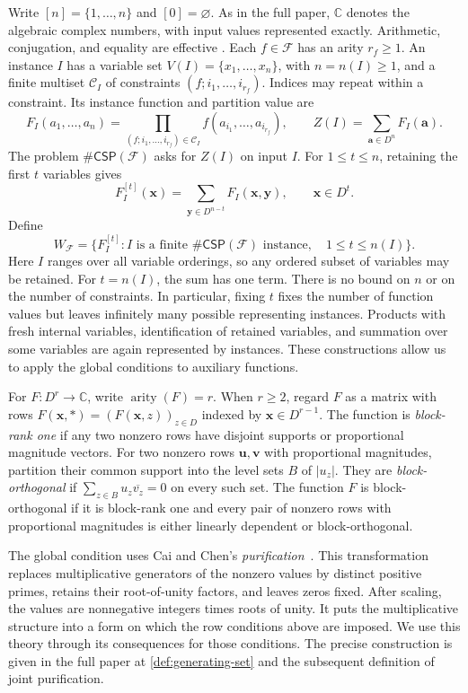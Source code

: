 \documentclass[11pt,letterpaper,onecolumn]{article}
\theoremstyle{plain}
\theoremstyle{definition}
\theoremstyle{remark}
\newcommand{\cF}{\mathcal F}
\newcommand{\CSP}[1]{\mathsf{\#CSP}(#1)}
\DeclareMathOperator{\arity}{arity}
\begin{document}
Write $[n]=\{1,\ldots,n\}$ and $[0]=\varnothing$. As in the full
paper, $\mathbb C$ denotes the algebraic complex numbers, with input values
represented exactly. Arithmetic, conjugation, and equality are effective
\cite[Section~4.2]{Cohen1993}. Each $f\in\cF$ has an arity $r_f\ge1$.
An instance $I$ has a variable set $V(I)=\{x_1,\ldots,x_n\}$, with
$n=n(I)\ge1$, and a finite multiset $\mathcal C_I$ of constraints
$(f;i_1,\ldots,i_{r_f})$.
Indices may repeat within a constraint. Its instance function and
partition value are
\[
 F_I(a_1,\ldots,a_n)
 =\prod_{(f;i_1,\ldots,i_{r_f})\in\mathcal C_I}
     f(a_{i_1},\ldots,a_{i_{r_f}}),
 \qquad Z(I)=\sum_{\mathbf a\in D^n}F_I(\mathbf a).
\]
The problem $\CSP{\cF}$ asks for $Z(I)$ on input $I$.
For $1\le t\le n$, retaining the first $t$ variables gives
\[
 F_I^{[t]}(\mathbf x)=\sum_{\mathbf y\in D^{n-t}}F_I(\mathbf x,\mathbf y),
 \qquad \mathbf x\in D^t.
\]
Define
\[
 W_{\cF}
 =\{F_I^{[t]}:I\text{ is a finite }\CSP{\cF}\text{ instance},\quad
                  1\le t\le n(I)\}.
\]
Here $I$ ranges over all variable orderings, so any ordered subset of
variables may be retained. For $t=n(I)$, the sum has one term.
There is no bound on $n$ or on the number of constraints. In particular,
fixing $t$ fixes the number of function values but leaves infinitely
many possible representing instances. Products with fresh internal
variables, identification of retained variables, and summation over
some variables are again represented by instances. These constructions
allow us to apply the global conditions to auxiliary functions.

For $F:D^r\to\mathbb C$, write $\arity(F)=r$. When $r\ge2$, regard $F$ as a matrix with
rows $F(\mathbf x,*)=(F(\mathbf x,z))_{z\in D}$ indexed by
$\mathbf x\in D^{r-1}$. The function is \emph{block-rank one} if
any two nonzero rows have disjoint supports or proportional magnitude
vectors. For two nonzero rows $\mathbf u,\mathbf v$ with proportional
magnitudes, partition their common support into the level sets $B$ of
$|u_z|$. They are \emph{block-orthogonal} if
$\sum_{z\in B}u_z\overline{v_z}=0$ on every such set.
The function $F$ is block-orthogonal if it is block-rank one and every
pair of nonzero rows with proportional magnitudes is either linearly
dependent or block-orthogonal.

The global condition uses Cai and Chen's
\emph{purification}~\cite[Lemma~7]{CaiChen2017}. This transformation
replaces multiplicative generators of the nonzero values by distinct
positive primes, retains their root-of-unity factors, and leaves zeros
fixed. After scaling, the values are nonnegative integers times roots
of unity. It puts the multiplicative structure into a form on which
the row conditions above are imposed. We use this theory through its
consequences for those conditions. The precise construction is given
in the full paper at \cref{def:generating-set} and the subsequent
definition of joint purification.
\end{document}
